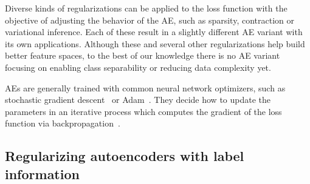 \documentclass[
	fontsize=11pt, %
	twoside=false, %
	open=any, %
	secnumdepth=1, %
]{kaobook}
\newcommand{\change}[1]{{\color{blue}#1}}
\renewcommand{\change}[1]{#1}
\begin{document}
Diverse kinds of regularizations can be applied to the loss function with the objective of adjusting the behavior of the AE\change{, such as sparsity, contraction or variational inference}. Each of these result in a slightly different AE variant with its own applications. Although these and several other regularizations help build better feature spaces, to the best of our knowledge there is no AE variant focusing on enabling class separability or reducing data complexity yet.

AEs are generally trained with common neural network optimizers, such as stochastic gradient descent~\cite{robbins1951stochastic} or Adam~\cite{adam}. \change{They decide how to update the parameters in an iterative process which computes the gradient of the loss function via backpropagation~\cite{backprop}.}

\subsection{\change{Regularizing autoencoders with label information}}
\end{document}
